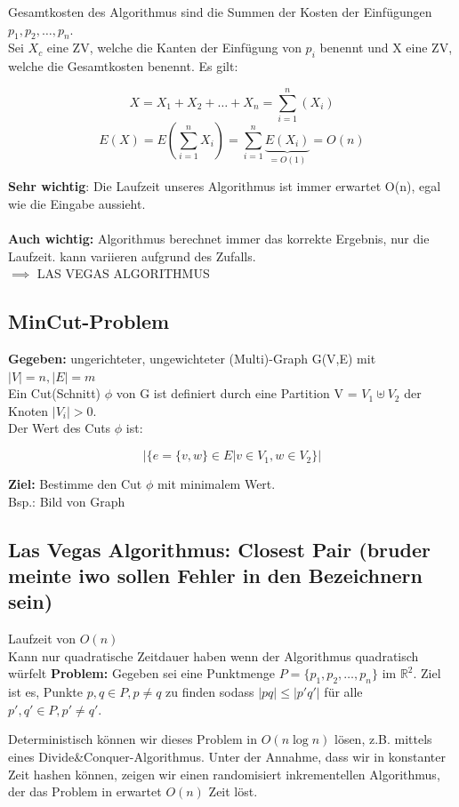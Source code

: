 \documentclass{article}
\begin{document}
Gesamtkosten des Algorithmus sind die Summen der Kosten der Einfügungen $p_1,p_2, \dots, p_n$.\\
Sei $X_c $ eine ZV, welche die Kanten der Einfügung von $p_i$ benennt und X eine ZV, welche die Gesamtkosten benennt. Es gilt:

 \[X=X_1 + X_2 + \dots + X_n = \sum_{i=1}^{n}(X_i) \]
 \[ E(X) = E\left(\sum_{i=1}^{n}X_i\right) = \sum_{i=1}^{n}\underbrace{E(X_i)}_{= O(1)} = O(n) \]


\textbf{Sehr wichtig}: Die Laufzeit unseres Algorithmus ist immer erwartet O(n), egal wie die Eingabe aussieht.\\
\\
\textbf{Auch wichtig:} Algorithmus berechnet immer das korrekte Ergebnis, nur die Laufzeit. kann variieren aufgrund des Zufalls.\\

$\implies $ LAS VEGAS ALGORITHMUS\\

\subsection{MinCut-Problem}
\textbf{Gegeben:} ungerichteter, ungewichteter (Multi)-Graph G(V,E) mit $|V| = n , |E| = m$ \\
Ein Cut(Schnitt) $\phi$ von G ist definiert durch eine Partition V = $ V_1 \uplus V_2 $ der Knoten $|V_i|>0$.\\
Der Wert des Cuts $\phi$ ist:

\[ |\{ e=\{v,w\} \in E | v \in V_1, w \in V_2 \}| \]

\textbf{Ziel:} Bestimme den Cut $\phi$ mit minimalem Wert.\\
Bsp.: Bild von Graph


\subsection{Las Vegas Algorithmus: Closest Pair (bruder meinte iwo sollen Fehler in den Bezeichnern sein) }
Laufzeit von $O(n)$\\
Kann nur quadratische Zeitdauer haben wenn der Algorithmus quadratisch würfelt
{\bf Problem:} Gegeben sei eine Punktmenge $P=\{p_1, p_2, \dots, p_n\}$ im $\mathbb{R}^2$. Ziel ist es, Punkte $p,q\in P, p\neq q$ zu finden sodass $|pq|\leq |p'q'|$ für alle $p', q'\in P, p'\neq q'$.

Deterministisch können wir dieses Problem in $O(n\log n)$ lösen, z.B. mittels eines Divide\&Conquer-Algorithmus. Unter der Annahme, dass wir in konstanter Zeit hashen können, zeigen wir einen randomisiert inkrementellen Algorithmus, der das Problem in erwartet $O(n)$ Zeit löst. 
 
\end{document}

